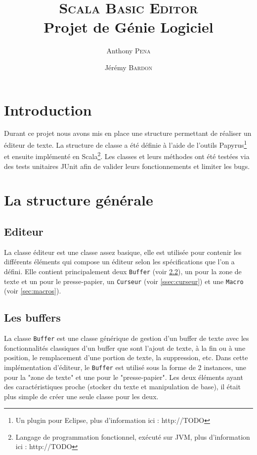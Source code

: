 \documentclass[french]{article}
\author{Anthony \textsc{Pena} \and Jérémy \textsc{Bardon}}
\title{\textsc{Scala Basic Editor}\\\normalsize{Projet de Génie Logiciel}}
\date{}
\begin{document}
\maketitle

\vspace{3cm}

\renewcommand\contentsname{Sommaire}
\tableofcontents

\newpage

\section{Introduction}

Durant ce projet nous avons mis en place une structure permettant de réaliser un éditeur de texte. La structure de classe a été définie à l'aide de l'outils Papyrus\footnote{Un plugin pour Eclipse, plus d'information ici : http://TODO} et ensuite implémenté en Scala\footnote{Langage de programmation fonctionnel, exécuté sur JVM, plus d'information ici : http://TODO}. Les classes et leurs méthodes ont été testées via des tests unitaires JUnit afin de valider leurs fonctionnements et limiter les bugs.

\section{La structure générale}

\subsection{Editeur}\label{ssec:éditeur}
La classe éditeur est une classe assez basique, elle est utilisée pour contenir les différents éléments qui compose un éditeur selon les spécifications que l'on a défini. Elle contient principalement deux \texttt{Buffer} (voir \ref{ssec:buffers}), un pour la zone de texte et un pour le presse-papier, un \texttt{Curseur} (voir \ref{ssec:curseur}) et une \texttt{Macro} (voir \ref{sec:macros}).

\subsection{Les buffers}\label{ssec:buffers}
La classe \texttt{Buffer} est une classe générique de gestion d'un buffer de texte avec les fonctionnalités classiques d'un buffer que sont l'ajout de texte, à la fin ou à une position, le remplacement d'une portion de texte, la suppression, etc. Dans cette implémentation d'éditeur, le \texttt{Buffer} est utilisé sous la forme de 2 instances, une pour la "zone de texte" et une pour le "presse-papier". Les deux éléments ayant des caractéristiques proche (stocker du texte et manipulation de base), il était plus simple de créer une seule classe pour les deux.
\end{document}
